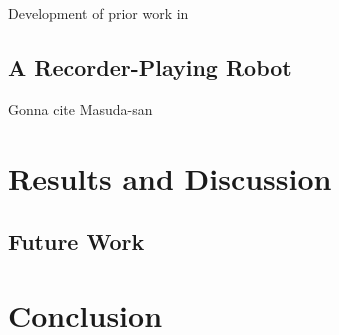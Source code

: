 \documentclass[english,12pt,a4paper,pdftex,eng,utf8]{aaltothesis}
\begin{document}
Development of prior work in~\cite{Bjoerklund2023}

\lipsum[1-6]

\subsection{A Recorder-Playing Robot}

Gonna cite Masuda-san~\cite{Masuda2012}

\lipsum[1-3]

\clearpage


\section{Results and Discussion}

\lipsum[1-3]

\subsection{Future Work}

\lipsum[8-9]

\clearpage


\section{Conclusion}

\lipsum[1-4]

\clearpage

{}




\clearpage

\thesisappendix

\end{document}
